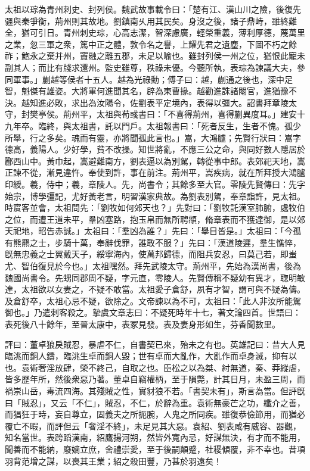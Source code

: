 \begin{pinyinscope}
太祖以琮為青州刺史、封列侯。魏武故事載令曰：「楚有江、漢山川之險，後復先疆與秦爭衡，荊州則其故地。劉鎮南乆用其民矣。身沒之後，諸子鼎峙，雖終難全，猶可引日。青州刺史琮，心高志潔，智深慮廣，輕榮重義，薄利厚德，蔑萬里之業，忽三軍之衆，篤中正之體，敦令名之譽，上耀先君之遺塵，下圖不朽之餘祚；鮑永之棄并州，竇融之離五郡，未足以喻也。雖封列侯一州之位，猶恨此寵未副其人；而比有牋求還州。監史雖尊，秩祿未優。今聽所執，表琮為諫議大夫，參同軍事。」蒯越等侯者十五人。越為光祿勳；傅子曰：越，蒯通之後也，深中足智，魁傑有雄姿。大將軍何進聞其名，辟為東曹掾。越勸進誅諸閹官，進猶豫不決。越知進必敗，求出為汝陽令，佐劉表平定境內，表得以彊大。詔書拜章陵太守，封樊亭侯。荊州平，太祖與荀彧書曰：「不喜得荊州，喜得蒯異度耳。」建安十九年卒。臨終，與太祖書，託以門戶。太祖報書曰：「死者反生，生者不愧。孤少所舉，行之多矣。魂而有靈，亦將聞孤此言也。」嵩，大鴻臚；先賢行狀曰：嵩字德高，義陽人。少好學，貧不改操。知世將亂，不應三公之命，與同好數人隱居於酈西山中。黃巾起，嵩避難南方，劉表逼以為別駕，轉從事中郎。表郊祀天地，嵩正諫不從，漸見違忤。奉使到許，事在前注。荊州平，嵩疾病，就在所拜授大鴻臚印綬。羲，侍中；羲，章陵人。先，尚書令；其餘多至大官。零陵先賢傳曰：先字始宗，博學彊記，尤好黃老言，明習漢家典故。為劉表別駕，奉章詣許，見太祖。時賔客並會，太祖問先：「劉牧如何郊天也？」先對曰：「劉牧託漢室肺腑，處牧伯之位，而遭王道未平，羣凶塞路，抱玉帛而無所聘頫，脩章表而不獲達御，是以郊天祀地，昭告赤誠。」太祖曰：「羣凶為誰？」先曰：「舉目皆是。」太祖曰：「今孤有熊羆之士，步騎十萬，奉辭伐罪，誰敢不服？」先曰：「漢道陵遲，羣生憔悴，旣無忠義之士翼戴天子，綏寧海內，使萬邦歸德，而阻兵安忍，曰莫己若，即蚩尤、智伯復見於今也。」太祖嘿然。拜先武陵太守。荊州平，先始為漢尚書，後為魏國尚書令。先甥同郡周不疑，字元直，零陵人。先賢傳稱不疑幼有異才，聦明敏達，太祖欲以女妻之，不疑不敢當。太祖愛子倉舒，夙有才智，謂可與不疑為儔。及倉舒卒，太祖心忌不疑，欲除之。文帝諫以為不可，太祖曰：「此人非汝所能駕御也。」乃遣刺客殺之。摯虞文章志曰：不疑死時年十七，著文論四首。世語曰：表死後八十餘年，至晉太康中，表冢見發。表及妻身形如生，芬香聞數里。

評曰：董卓狼戾賊忍，暴虐不仁，自書契已來，殆未之有也。英雄記曰：昔大人見臨洮而銅人鑄，臨洮生卓而銅人毀；世有卓而大亂作，大亂作而卓身滅，抑有以也。袁術奢淫放肆，榮不終己，自取之也。臣松之以為桀、紂無道，秦、莽縱虐，皆多歷年所，然後衆惡乃著。董卓自竊權柄，至于隕斃，計其日月，未盈三周，而禍崇山岳，毒流四海。其殘賊之性，實豺狼不若。「書契未有」，斯言為當。但評旣曰「賊忍」，又云「不仁」，賊忍，不仁，於辭為重。袁術無豪芒之功，纖介之善，而猖狂于時，妄自尊立，固義夫之所扼腕，人鬼之所同疾。雖復恭儉節用，而猶必覆亡不暇，而評但云「奢淫不終」，未足見其大惡。袁紹、劉表咸有威容、器觀，知名當世。表跨蹈漢南，紹鷹揚河朔，然皆外寬內忌，好謀無決，有才而不能用，聞善而不能納，廢嫡立庶，舍禮崇愛，至于後嗣顛蹙，社稷傾覆，非不幸也。昔項羽背范增之謀，以喪其王業；紹之殺田豐，乃甚於羽遠矣！


\end{pinyinscope}
